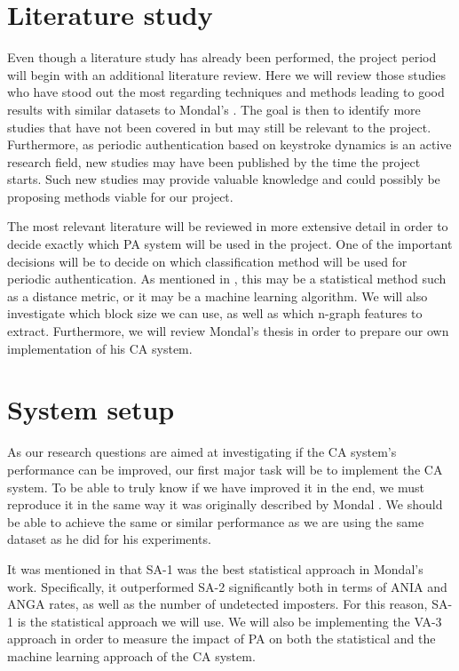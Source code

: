 \documentclass[informationsecurity]{gucmasterproject}
\begin{document}
\section{Literature study}
Even though a literature study has already been performed, the project period will begin with an additional literature review.
Here we will review those studies who have stood out the most regarding techniques and methods leading to good results with similar datasets to Mondal's \cite{mondal}.
The goal is then to identify more studies that have not been covered in  but may still be relevant to the project.
Furthermore, as periodic authentication based on keystroke dynamics is an active research field, new studies may have been published by the time the project starts.
Such new studies may provide valuable knowledge and could possibly be proposing methods viable for our project.

The most relevant literature will be reviewed in more extensive detail in order to decide exactly which PA system will be used in the project.
One of the important decisions will be to decide on which classification method will be used for periodic authentication.
As mentioned in , this may be a statistical method such as a distance metric, or it may be a machine learning algorithm.
We will also investigate which block size we can use, as well as which n-graph features to extract.
Furthermore, we will review Mondal's \cite{mondal} thesis in order to prepare our own implementation of his CA system.

\section{System setup}
As our research questions are aimed at investigating if the CA system's performance can be improved, our first major task will be to implement the CA system.
To be able to truly know if we have improved it in the end, we must reproduce it in the same way it was originally described by Mondal \cite{mondal}.
We should be able to achieve the same or similar performance as we are using the same dataset as he did for his experiments.

It was mentioned in  that SA-1 was the best statistical approach in Mondal's work.
Specifically, it outperformed SA-2 significantly both in terms of ANIA and ANGA rates, as well as the number of undetected imposters.
For this reason, SA-1 is the statistical approach we will use.
We will also be implementing the VA-3 approach in order to measure the impact of PA on both the statistical and the machine learning approach of the CA system.
\end{document}
